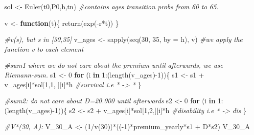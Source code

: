 \documentclass[
]{article}
\newenvironment{Shaded}{\begin{snugshade}}{\end{snugshade}}
\newcommand{\AttributeTok}[1]{\textcolor[rgb]{0.77,0.63,0.00}{#1}}
\newcommand{\CommentTok}[1]{\textcolor[rgb]{0.56,0.35,0.01}{\textit{#1}}}
\newcommand{\ControlFlowTok}[1]{\textcolor[rgb]{0.13,0.29,0.53}{\textbf{#1}}}
\newcommand{\DecValTok}[1]{\textcolor[rgb]{0.00,0.00,0.81}{#1}}
\newcommand{\FunctionTok}[1]{\textcolor[rgb]{0.00,0.00,0.00}{#1}}
\newcommand{\NormalTok}[1]{#1}
\newcommand{\OtherTok}[1]{\textcolor[rgb]{0.56,0.35,0.01}{#1}}
\newcommand{\SpecialCharTok}[1]{\textcolor[rgb]{0.00,0.00,0.00}{#1}}
\begin{document}
\begin{Shaded}
\begin{Highlighting}[]
\NormalTok{sol }\OtherTok{\textless{}{-}} \FunctionTok{Euler}\NormalTok{(t0,P0,h,tn) }\CommentTok{\#contains ages transition probs from 60 to 65.}

\NormalTok{v }\OtherTok{\textless{}{-}} \ControlFlowTok{function}\NormalTok{(t)\{}
  \FunctionTok{return}\NormalTok{(}\FunctionTok{exp}\NormalTok{(}\SpecialCharTok{{-}}\NormalTok{r}\SpecialCharTok{*}\NormalTok{t))}
\NormalTok{\}}


\CommentTok{\#v(s), but s in [30,35]}
\NormalTok{v\_ages }\OtherTok{\textless{}{-}} \FunctionTok{sapply}\NormalTok{(}\FunctionTok{seq}\NormalTok{(}\DecValTok{30}\NormalTok{, }\DecValTok{35}\NormalTok{, }\AttributeTok{by =}\NormalTok{ h), v) }\CommentTok{\#we apply the function v to each element}




\CommentTok{\#sum1 where we do not care about the premium until afterwards, we use Riemann{-}sum.}
\NormalTok{s1 }\OtherTok{\textless{}{-}} \DecValTok{0} 
\ControlFlowTok{for}\NormalTok{ (i }\ControlFlowTok{in} \DecValTok{1}\SpecialCharTok{:}\NormalTok{(}\FunctionTok{length}\NormalTok{(v\_ages)}\SpecialCharTok{{-}}\DecValTok{1}\NormalTok{))\{}
\NormalTok{  s1 }\OtherTok{\textless{}{-}}\NormalTok{ s1 }\SpecialCharTok{+}\NormalTok{ v\_ages[i]}\SpecialCharTok{*}\NormalTok{sol[}\DecValTok{1}\NormalTok{,}\DecValTok{1}\NormalTok{, ][i]}\SpecialCharTok{*}\NormalTok{h }\CommentTok{\#survival i.e * {-}\textgreater{} *}
\NormalTok{\}}

\CommentTok{\#sum2: do not care about D=20.000 until afterwards}
\NormalTok{s2 }\OtherTok{\textless{}{-}} \DecValTok{0} 
\ControlFlowTok{for}\NormalTok{ (i }\ControlFlowTok{in} \DecValTok{1}\SpecialCharTok{:}\NormalTok{(}\FunctionTok{length}\NormalTok{(v\_ages)}\SpecialCharTok{{-}}\DecValTok{1}\NormalTok{))\{}
\NormalTok{  s2 }\OtherTok{\textless{}{-}}\NormalTok{ s2 }\SpecialCharTok{+}\NormalTok{ v\_ages[i]}\SpecialCharTok{*}\NormalTok{sol[}\DecValTok{1}\NormalTok{,}\DecValTok{2}\NormalTok{,][i]}\SpecialCharTok{*}\NormalTok{h }\CommentTok{\#disability i.e * {-}\textgreater{} dis}
\NormalTok{\}}
 
\CommentTok{\#V*(30, A): }
\NormalTok{V\_30\_A }\OtherTok{\textless{}{-}}\NormalTok{ (}\DecValTok{1}\SpecialCharTok{/}\FunctionTok{v}\NormalTok{(}\DecValTok{30}\NormalTok{))}\SpecialCharTok{*}\NormalTok{((}\SpecialCharTok{{-}}\DecValTok{1}\NormalTok{)}\SpecialCharTok{*}\NormalTok{premium\_yearly}\SpecialCharTok{*}\NormalTok{s1 }\SpecialCharTok{+}\NormalTok{ D}\SpecialCharTok{*}\NormalTok{s2)}
\NormalTok{V\_30\_A}
\end{Highlighting}
\end{Shaded}
\end{document}

